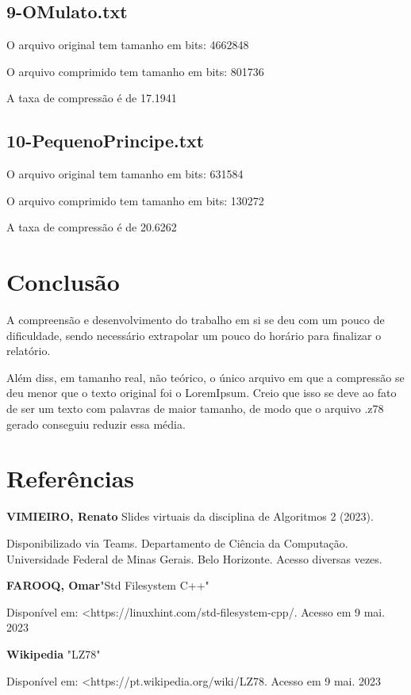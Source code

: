 \documentclass[12pt]{article}
\begin{document}
\subsection{	9-OMulato.txt}                         
\space \par O arquivo original tem tamanho em bits: 4662848
\space \par O arquivo comprimido tem tamanho em bits: 801736
\space \par A taxa de compressão é de 17.1941%

\subsection{	10-PequenoPrincipe.txt}                                  
\space \par O arquivo original tem tamanho em bits: 631584
\space \par O arquivo comprimido tem tamanho em bits: 130272
\space \par A taxa de compressão é de 20.6262%



\section{Conclusão}
\par A compreensão e desenvolvimento do trabalho em si se deu com um pouco de dificuldade, sendo necessário extrapolar um pouco do horário para finalizar o relatório.
\par Além diss, em tamanho real, não teórico, o único arquivo em que a compressão se deu menor que o texto original foi o LoremIpsum. Creio que isso se deve ao fato de ser um texto com palavras de maior tamanho, de modo que o arquivo .z78 gerado conseguiu reduzir essa média.



\section*{Referências}

\par \textbf{VIMIEIRO, Renato} Slides virtuais da disciplina de Algoritmos 2 (2023).
\par Disponibilizado via Teams. Departamento de Ciência da Computação. Universidade Federal de Minas Gerais. Belo Horizonte. Acesso diversas vezes.
\par \textbf{FAROOQ, Omar}"Std Filesystem C++"
\par Disponível em: \textless https://linuxhint.com/std-filesystem-cpp/. Acesso em 9 mai. 2023
\par \textbf{Wikipedia} "LZ78"
\par Disponível em: \textless https://pt.wikipedia.org/wiki/LZ78. Acesso em 9 mai. 2023
\end{document}
